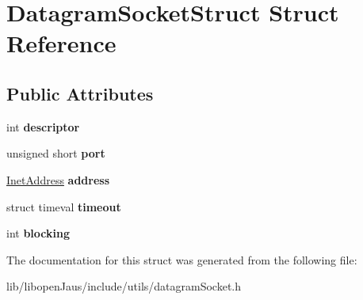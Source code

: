 \hypertarget{struct_datagram_socket_struct}{\section{\-Datagram\-Socket\-Struct \-Struct \-Reference}
\label{struct_datagram_socket_struct}
}
\subsection*{\-Public \-Attributes}
\begin{DoxyCompactItemize}
\item 
\hypertarget{struct_datagram_socket_struct_a0598a773ed38f0e23683da86e53ccb48}{int {\bfseries descriptor}}\label{struct_datagram_socket_struct_a0598a773ed38f0e23683da86e53ccb48}

\item 
\hypertarget{struct_datagram_socket_struct_af40d62b17ec1257ea6877ee95d3ef332}{unsigned short {\bfseries port}}\label{struct_datagram_socket_struct_af40d62b17ec1257ea6877ee95d3ef332}

\item 
\hypertarget{struct_datagram_socket_struct_a2b1abe1934f4640fd4eaea8a9938cdf3}{\hyperlink{struct_inet_address_struct}{\-Inet\-Address} {\bfseries address}}\label{struct_datagram_socket_struct_a2b1abe1934f4640fd4eaea8a9938cdf3}

\item 
\hypertarget{struct_datagram_socket_struct_adf34ff982730f041be7c6a22174b5494}{struct timeval {\bfseries timeout}}\label{struct_datagram_socket_struct_adf34ff982730f041be7c6a22174b5494}

\item 
\hypertarget{struct_datagram_socket_struct_a351a5912a826e834967fd95c0ebd0e06}{int {\bfseries blocking}}\label{struct_datagram_socket_struct_a351a5912a826e834967fd95c0ebd0e06}

\end{DoxyCompactItemize}


\-The documentation for this struct was generated from the following file\-:\begin{DoxyCompactItemize}
\item 
lib/libopen\-Jaus/include/utils/datagram\-Socket.\-h\end{DoxyCompactItemize}
